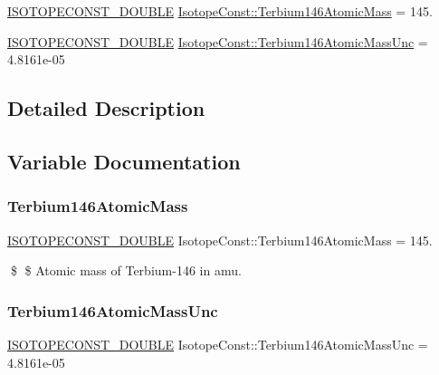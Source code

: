 \begin{DoxyCompactItemize}
\item 
\mbox{\hyperlink{group___isotope_const-_macros_ga8f45a7272ce02c0b4c65c44636ed719a}{I\+S\+O\+T\+O\+P\+E\+C\+O\+N\+S\+T\+\_\+\+D\+O\+U\+B\+LE}} \mbox{\hyperlink{group___isotope_const-_terbium-_tb146_gaf5aced20e489e2b659958f83ea869274}{Isotope\+Const\+::\+Terbium146\+Atomic\+Mass}} = 145.
\item 
\mbox{\hyperlink{group___isotope_const-_macros_ga8f45a7272ce02c0b4c65c44636ed719a}{I\+S\+O\+T\+O\+P\+E\+C\+O\+N\+S\+T\+\_\+\+D\+O\+U\+B\+LE}} \mbox{\hyperlink{group___isotope_const-_terbium-_tb146_gaa4ac4260c24addcb5ad587ab0d426e09}{Isotope\+Const\+::\+Terbium146\+Atomic\+Mass\+Unc}} = 4.\+8161e-\/05
\end{DoxyCompactItemize}


\subsection{Detailed Description}


\subsection{Variable Documentation}
\mbox{\label{group___isotope_const-_terbium-_tb146_gaf5aced20e489e2b659958f83ea869274}} 
\subsubsection{\texorpdfstring{Terbium146\+Atomic\+Mass}{Terbium146AtomicMass}}
{\footnotesize\ttfamily \mbox{\hyperlink{group___isotope_const-_macros_ga8f45a7272ce02c0b4c65c44636ed719a}{I\+S\+O\+T\+O\+P\+E\+C\+O\+N\+S\+T\+\_\+\+D\+O\+U\+B\+LE}} Isotope\+Const\+::\+Terbium146\+Atomic\+Mass = 145.}

\$ \$ Atomic mass of Terbium-\/146 in amu. \mbox{\label{group___isotope_const-_terbium-_tb146_gaa4ac4260c24addcb5ad587ab0d426e09}} 
\subsubsection{\texorpdfstring{Terbium146\+Atomic\+Mass\+Unc}{Terbium146AtomicMassUnc}}
{\footnotesize\ttfamily \mbox{\hyperlink{group___isotope_const-_macros_ga8f45a7272ce02c0b4c65c44636ed719a}{I\+S\+O\+T\+O\+P\+E\+C\+O\+N\+S\+T\+\_\+\+D\+O\+U\+B\+LE}} Isotope\+Const\+::\+Terbium146\+Atomic\+Mass\+Unc = 4.\+8161e-\/05}

